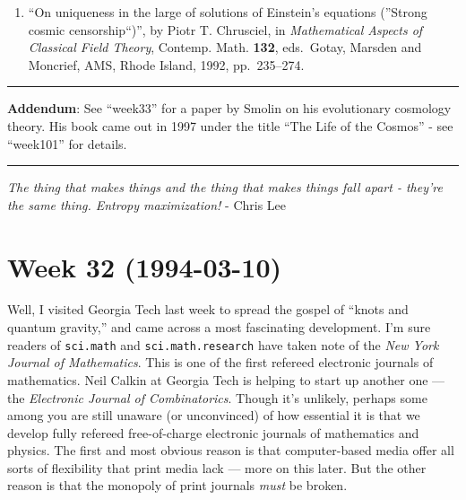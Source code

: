 \documentclass{article}
\def\tightlist{}
\begin{document}
\begin{enumerate}
\def\labelenumi{\arabic{enumi})}
\setcounter{enumi}{8}
\tightlist
\item
  ``On uniqueness in the large of solutions of Einstein's equations
  (''Strong cosmic censorship``)'', by Piotr T. Chrusciel, in
  \emph{Mathematical Aspects of Classical Field Theory}, Contemp. Math.
  \textbf{132}, eds.~Gotay, Marsden and Moncrief, AMS, Rhode Island,
  1992, pp.~235--274.
\end{enumerate}

\begin{center}\rule{0.5\linewidth}{0.5pt}\end{center}

\textbf{Addendum}: See ``week33'' for a paper by Smolin on his
evolutionary cosmology theory. His book came out in 1997 under the title
``The Life of the Cosmos'' - see ``week101'' for details.

\begin{center}\rule{0.5\linewidth}{0.5pt}\end{center}

\emph{The thing that makes things and the thing that makes things fall
apart - they're the same thing. Entropy maximization!} - Chris Lee
\hypertarget{week-32-1994-03-10}{%
\section{Week 32 (1994-03-10)}\label{week-32-1994-03-10}}

Well, I visited Georgia Tech last week to spread the gospel of ``knots
and quantum gravity,'' and came across a most fascinating development.
I'm sure readers of \texttt{sci.math} and \texttt{sci.math.research}
have taken note of the \emph{New York Journal of Mathematics}. This is
one of the first refereed electronic journals of mathematics. Neil
Calkin at Georgia Tech is helping to start up another one --- the
\emph{Electronic Journal of Combinatorics}. Though it's unlikely,
perhaps some among you are still unaware (or unconvinced) of how
essential it is that we develop fully refereed free-of-charge electronic
journals of mathematics and physics. The first and most obvious reason
is that computer-based media offer all sorts of flexibility that print
media lack --- more on this later. But the other reason is that the
monopoly of print journals \emph{must} be broken.
\end{document}
